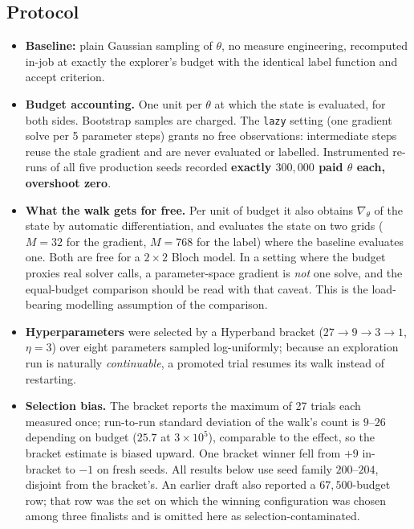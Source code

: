 \documentclass[11pt]{article}
\newcommand{\good}[1]{\textcolor{blue!70!black}{\textbf{#1}}}
\newcommand{\bad}[1]{\textcolor{red!65!black}{#1}}
\begin{document}
\subsection{Protocol}

\begin{itemize}\itemsep1pt
\item \textbf{Baseline:} plain Gaussian sampling of $\theta$, no measure
engineering, recomputed in-job at exactly the explorer's budget with the
identical label function and accept criterion.
\item \textbf{Budget accounting.} One unit per $\theta$ at which the state is
evaluated, for both sides. Bootstrap samples are charged. The \texttt{lazy}
setting (one gradient solve per 5 parameter steps) grants no free observations:
intermediate steps reuse the stale gradient and are never evaluated or
labelled. Instrumented re-runs of all five production seeds recorded
\good{exactly $300{,}000$ paid $\theta$ each, overshoot zero}.
\item \textbf{What the walk gets for free.} Per unit of budget it also obtains
$\nabla_\theta$ of the state by automatic differentiation, and evaluates the
state on two grids ($M=32$ for the gradient, $M=768$ for the label) where the
baseline evaluates one. Both are free for a $2\times2$ Bloch model. In a
setting where the budget proxies real solver calls, a parameter-space gradient
is \emph{not} one solve, and the equal-budget comparison should be read with
that caveat. This is the load-bearing modelling assumption of the comparison.
\item \textbf{Hyperparameters} were selected by a Hyperband bracket
\cite{hyperband2018} ($27\to9\to3\to1$, $\eta=3$) over eight parameters sampled
log-uniformly; because an exploration run is naturally \emph{continuable}, a
promoted trial resumes its walk instead of restarting.
\item \textbf{Selection bias.} The bracket reports the maximum of 27 trials each
measured once; run-to-run standard deviation of the walk's count is $9$--$26$
depending on budget ($25.7$ at $3\times10^5$), comparable to the effect, so the
bracket estimate is biased upward. One bracket winner fell from $+9$ in-bracket
to \bad{$-1$} on fresh seeds. All results below use seed family $200$--$204$,
disjoint from the bracket's. \bad{An earlier draft also reported a
$67{,}500$-budget row; that row was the set on which the winning configuration
was chosen among three finalists and is omitted here as selection-contaminated.}
\end{itemize}
\end{document}
